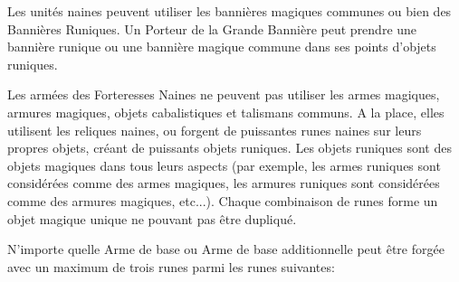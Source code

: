 
Les unités naines peuvent utiliser les bannières magiques communes ou bien des Bannières Runiques. Un Porteur de la Grande Bannière peut prendre une bannière runique ou une bannière magique commune dans ses points d’objets runiques.

\begin{customitemize}
	\item {}
	\item {}
	\item {}

\end{customitemize}


Les armées des Forteresses Naines ne peuvent pas utiliser les armes magiques, armures magiques, objets cabalistiques et talismans communs. A la place, elles utilisent les reliques naines, ou forgent de puissantes runes naines sur leurs propres objets, créant de puissants objets runiques. Les objets runiques sont des objets magiques dans tous leurs aspects (par exemple, les armes runiques sont considérées comme des armes magiques, les armures runiques sont considérées comme des armures magiques, etc...).
Chaque combinaison de runes forme un objet magique unique ne pouvant pas être dupliqué.


N'importe quelle Arme de base ou Arme de base additionnelle peut être forgée avec un maximum de trois runes parmi les runes suivantes:

